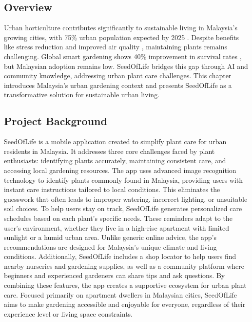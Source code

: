 \documentclass[conference]{IEEEtran}
\begin{document}
\subsection{Overview}
\label{sec:overview}
Urban horticulture contributes significantly to sustainable living in Malaysia's growing cities, with 75\% urban population expected by 2025 \cite{stats2023}. Despite benefits like stress reduction and improved air quality \cite{lim2023}, maintaining plants remains challenging. Global smart gardening shows 40\% improvement in survival rates \cite{global2024}, but Malaysian adoption remains low.
SeedOfLife bridges this gap through AI and community knowledge, addressing urban plant care challenges. This chapter introduces Malaysia's urban gardening context and presents SeedOfLife as a transformative solution for sustainable urban living.

\subsection{Project Background}
\label{subsec:project-background}
SeedOfLife is a mobile application created to simplify plant care for urban residents in Malaysia. It addresses three core challenges faced by plant enthusiasts: identifying plants accurately, maintaining consistent care, and accessing local gardening resources.
The app uses advanced image recognition technology \cite{chen2023, plantnet2024, plantid2024} to identify plants commonly found in Malaysia, providing users with instant care instructions tailored to local conditions. This eliminates the guesswork that often leads to improper watering, incorrect lighting, or unsuitable soil choices.
To help users stay on track, SeedOfLife generates personalized care schedules based on each plant's specific needs. These reminders adapt to the user's environment, whether they live in a high-rise apartment with limited sunlight \cite{wong2023} or a humid urban area. Unlike generic online advice, the app's recommendations are designed for Malaysia's unique climate and living conditions.
Additionally, SeedOfLife includes a shop locator to help users find nearby nurseries and gardening supplies, as well as a community platform \cite{ugam2024} where beginners and experienced gardeners can share tips and ask questions. By combining these features, the app creates a supportive ecosystem for urban plant care.
Focused primarily on apartment dwellers in Malaysian cities, SeedOfLife aims to make gardening accessible and enjoyable for everyone, regardless of their experience level or living space constraints.
\end{document}

